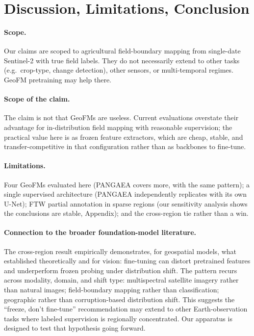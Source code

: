 \documentclass{article}
\begin{document}
\section{Discussion, Limitations, Conclusion}
\label{sec:disc}
\paragraph{Scope.} Our claims are scoped to agricultural field-boundary mapping from
single-date Sentinel-2 with true field labels. They do not necessarily extend to
other tasks (e.g.\ crop-type, change detection), other sensors, or multi-temporal
regimes. GeoFM pretraining may help there.

\paragraph{Scope of the claim.} The claim is not that GeoFMs are useless. Current
evaluations overstate their advantage for in-distribution field mapping with
reasonable supervision; the practical value here is as frozen feature extractors,
which are cheap, stable, and transfer-competitive in that configuration rather than
as backbones to fine-tune.

\paragraph{Limitations.} Four GeoFMs evaluated here (PANGAEA covers more, with the
same pattern); a single supervised architecture (PANGAEA independently replicates
with its own U-Net); FTW partial annotation in sparse regions (our sensitivity
analysis shows the conclusions are stable, Appendix); and the cross-region tie
rather than a win.

\paragraph{Connection to the broader foundation-model literature.} The cross-region
result empirically demonstrates, for geospatial models, what
\citet{kumar2022finetuning} established theoretically and for vision: fine-tuning
can distort pretrained features and underperform frozen probing under distribution
shift. The pattern recurs across modality, domain, and shift
type: multispectral satellite imagery rather than natural images; field-boundary
mapping rather than classification; geographic rather than corruption-based
distribution shift. This suggests the ``freeze, don't fine-tune'' recommendation
may extend to other Earth-observation tasks where labeled supervision is
regionally concentrated. Our apparatus is designed to test that hypothesis going
forward.
\end{document}
